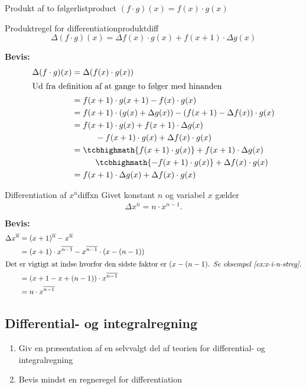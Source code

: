 \documentclass{article}
\begin{document}
\begin{definition}{Produkt af to følger}{listproduct}
	$ (f \cdot g)(x) = f(x) \cdot g(x) $ 
\end{definition}

\begin{theorem}{Produktregel for differentiation}{produktdiff}
	\[
		\Delta (f \cdot g)(x) = \Delta f(x) \cdot g(x) + f(x + 1) \cdot \Delta g(x)
	\] 
\end{theorem}
\textbf{Bevis:}
\begin{align*}
	\Delta (f \cdot g)(x) &= \Delta (f(x) \cdot g(x))\\
	\intertext{Ud fra definition af at gange to følger med hinanden}
						  &= f(x + 1) \cdot g(x + 1) - f(x) \cdot g(x)\\
						  &= f(x + 1) \cdot (g(x) + \Delta g(x)) - (f(x + 1) - \Delta f(x)) \cdot g(x)\\
						  &= f(x + 1) \cdot g(x) + f(x + 1) \cdot \Delta g(x) \\
						  &\gap- f(x + 1) \cdot g(x) + \Delta f(x) \cdot g(x)\\
						  &= \tcbhighmath{f(x + 1) \cdot g(x)} + f(x + 1) \cdot \Delta g(x) \\
						  &\gap\tcbhighmath{- f(x + 1) \cdot g(x)} + \Delta f(x) \cdot g(x)\\
						  &= f(x + 1) \cdot \Delta g(x) + \Delta f(x) \cdot g(x)
\end{align*}

\begin{theorem}{Differentiation af $x^{\overline{n}}$}{diffxn}
	Givet konstant $n$ og variabel $x$ gælder
	\[
		\Delta x^{\overline{n}} = n \cdot x^{\overline{n-1}}.
	\]
\end{theorem}
\textbf{Bevis:}
\begin{align*}
	\Delta x^{\overline{n}} &= (x+1)^{\overline{n}} - x^{\overline{n}}\\
	&= (x+1) \cdot x^{\overline{n-1}} - x^{\overline{n-1}} \cdot (x - (n-1))\\
\intertext{Det er vigtigt at indse hvorfor den sidste faktor er $(x - (n-1)$.
	\textit{Se eksempel \ref{ex:x-i-n-streg}.}}
	&= (x + 1 - x + (n - 1)) \cdot x^{\overline{n-1}}\\
	&= n \cdot x^{\overline{n-1}}
\end{align*}

\begin{tcolorbox}
	\section{Differential- og integralregning}
	\tcblower
	\begin{enumerate}
		\item Giv en præsentation af en selvvalgt del af teorien for
			differential- og integralregning		
		\item Bevis mindst en regneregel for differentiation	
	\end{enumerate}
\end{tcolorbox}
\end{document}
